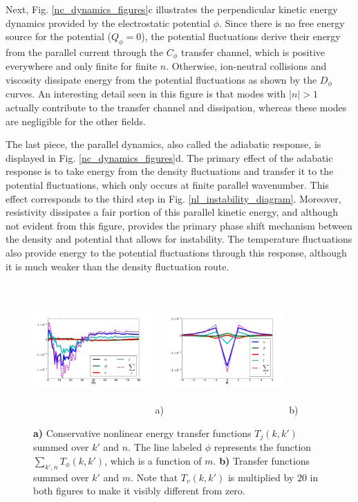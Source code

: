 \documentclass[showpacs,preprintnumbers,amsmath,amssymb,superscriptaddress]{revtex4}
\begin{document}
Next, Fig. \ref{nc_dynamics_figures}c illustrates the perpendicular kinetic energy dynamics provided by the electrostatic potential $\phi$. 
Since there is no free energy source for the potential ($Q_\phi=0$),
the potential fluctuations derive their energy from the parallel current through the $C_\phi$ transfer channel, which is positive everywhere and only finite for finite $n$. Otherwise, ion-neutral
collisions and viscosity dissipate energy from the potential fluctuations as shown by the $D_\phi$ curves. An interesting detail seen in this figure is that modes with $|n| > 1$ actually
contribute to the transfer channel and dissipation, whereas these modes are negligible for the other fields. 

The last piece, the parallel dynamics, also called the adiabatic response, is displayed in Fig. \ref{nc_dynamics_figures}d. 
The primary effect of the adabatic response is to take energy from the density
fluctuations and transfer it to the potential fluctuations, which only occurs at finite parallel wavenumber. This effect corresponds to the third step in Fig. \ref{nl_instability_diagram}.
Moreover, resistivity dissipates a fair portion of this parallel kinetic energy, and although not evident from this figure, provides
the primary phase shift mechanism between the density and potential that allows for instability. The temperature fluctuations also provide energy to the potential fluctuations
through this response, although it is much weaker than the density fluctuation route. 


\begin{figure}
\includegraphics[width=0.40\textwidth,height=50mm]{T_m}~a)
\hfil
\includegraphics[width=0.40\textwidth,height=50mm]{T_n}~b)
\hfil
\caption{\textbf{a)} Conservative nonlinear energy transfer functions $T_j(k,k')$ summed over $k'$ and $n$. The line labeled $\phi$ represents the function $\sum_{k',n} T_\phi(k,k')$,
which is a function of $m$. 
\textbf{b)} Transfer functions summed over $k'$ and $m$. Note that $T_v(k,k')$ is multiplied by $20$ in both figures to make it visibly different from zero.}
\label{conservative_transfers}
\end{figure}
\end{document}
